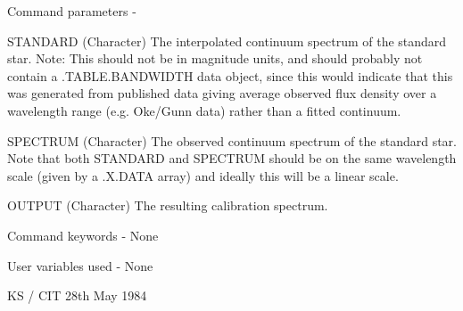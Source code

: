 \begin{description}
\begin{terminalv}
 Command parameters -

 STANDARD    (Character) The interpolated continuum spectrum of
             the standard star.  Note: This should not be in
             magnitude units, and should probably not contain a
             .TABLE.BANDWIDTH data object, since this would
             indicate that this was generated from published
             data giving average observed flux density over a
             wavelength range (e.g. Oke/Gunn data) rather than a
             fitted continuum.

 SPECTRUM    (Character) The observed continuum spectrum of the
             standard star.  Note that both STANDARD and SPECTRUM
             should be on the same wavelength scale (given by
             a .X.DATA array) and ideally this will be a linear
             scale.

 OUTPUT      (Character) The resulting calibration spectrum.

 Command keywords -  None

 User variables used -  None

                                    KS / CIT 28th May 1984
\end{terminalv}
\end{description}
